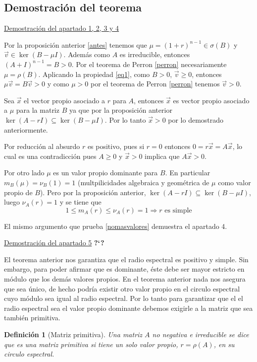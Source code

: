 \documentclass[size=a4, parskip=half, titlepage=false, toc=flat, toc=bib, 12pt]{scrartcl}
\makeatletter
\renewenvironment{proof}[1][\proofname] {\par\pushQED{\qed}\normalfont\topsep6\p@\@plus6\p@\relax\trivlist\item[\hskip\labelsep\itshape\tgpaella#1\@addpunct{.}]\ignorespaces}{\popQED\endtrivlist\@endpefalse}
\theoremstyle{theorem-style}
\theoremstyle{definition-style}
\newtheorem{ndef}{Definición}[section]
\theoremstyle{remark-style}
\theoremstyle{example-style}
\theoremstyle{definition-style}
\theoremstyle{remark-style}
\makeatother
\begin{document}
\subsection{Demostración del teorema}
\underline{Demostración del apartado 1, 2, 3 y 4}
\begin{proof}
Por la proposición anterior \ref{antes} tenemos que $\mu = (1+ r)^{n-1} \in \sigma(B)$ y $\vec{v} \in \ker(B - \mu I)$. Además como $A$ es irreducible, entonces $(A + I)^{n-1} = B >0$. Por el teorema de Perron \ref{perron} necesariamente $\mu = \rho(B)$. Aplicando la propiedad \ref{eq1}, como $B > 0$, $\vec{v} \geq 0$, entonces $\mu \vec{v} = B \vec{v} > 0$ y como $\mu > 0$ por el teorema de Perron \ref{perron} tenemos $\vec{v} > 0$.

Sea $\vec{x}$ el vector propio asociado a $r$ para $A$, entonces $\vec{x}$ es vector propio asociado a $\mu$ para la matriz $B$ ya que por la proposición anterior $\ker(A - rI) \subseteq \ker(B - \mu I)$. Por lo tanto $\vec{x} > 0$ por lo demostrado anteriormente.

Por reducción al absurdo $r$ es positivo, pues si $r = 0$ entonces $ 0 = r \vec{x} = A \vec{x}$, lo cual es una contradicción pues $A \geq 0$ y $\vec{x} > 0$ implica que $A\vec{x} > 0$.

Por otro lado $\mu$ es un valor propio dominante para $B$. En particular $m_B(\mu) = \nu_B (1) = 1$ (multpilicidades algebraica y geométrica de $\mu$ como valor propio de $B$). Pero por la proposición anterior, $\ker(A - r I) \subseteq \ker(B - \mu I)$, luego $\nu_A(r) = 1$ y se tiene que
$$1 \leq m_A(r) \leq \nu_A(r) = 1 \Rightarrow r \textrm{ es simple} $$

El mismo argumento que prueba \ref{nomasvalores}
demuestra el apartado 4.
\end{proof}

\underline{Demostración del apartado 5}
\textbf{?`?}

El teorema anterior nos garantiza que el radio espectral es positivo y simple. Sin embargo, para poder afirmar que es dominante, éste debe ser mayor estricto en módulo que los demás valores propios. En el teorema anterior nada nos asegura que sea único, de hecho podría existir otro valor propio en el circulo espectral cuyo módulo sea igual al radio espectral. Por lo tanto para garantizar que el el radio espectral sea el valor propio dominante debemos exigirle a la matriz que sea también primitiva.

\begin{ndef}[Matriz primitiva]
Una matriz $A$ no negativa e irreducible se dice que es una matriz primitiva si tiene un solo valor propio, $r = \rho(A)$, en su circulo espectral.
\end{ndef}
\end{document}
